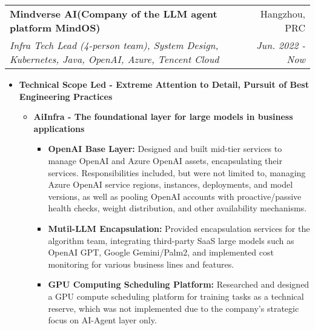 \documentclass[letterpaper,11pt]{article}
\makeatletter
\newcommand{\resumeSubheading}[4]{
	\vspace{-1pt}\item
	\begin{tabular*}{0.97\textwidth}[t]{l@{\extracolsep{\fill}}r}
		\textbf{#1} & #2 \\
		\textit{\small#3} & \textit{\small #4} \\
	\end{tabular*}\vspace{-5pt}
}
\makeatother
\begin{document}
\begin{spacing}{1.0}
	\resumeSubheading
	{Mindverse AI(Company of the LLM agent platform MindOS)}{Hangzhou, PRC}
	{Infra Tech Lead (4-person team), System Design, Kubernetes, Java, OpenAI, Azure, Tencent Cloud}{Jun. 2022 - Now}
	\begin{itemize}
		\item \textbf{Technical Scope Led - Extreme Attention to Detail, Pursuit of Best Engineering Practices}
		\begin{itemize}
			\item \textbf{AiInfra - The foundational layer for large models in business applications}
			\begin{itemize}
				\item \textbf{OpenAI Base Layer: }Designed and built mid-tier services to manage OpenAI and Azure OpenAI assets, encapsulating their services. Responsibilities included, but were not limited to, managing Azure OpenAI service regions, instances, deployments, and model versions, as well as pooling OpenAI accounts with proactive/passive health checks, weight distribution, and other availability mechanisms.
				\item \textbf{Mutil-LLM Encapsulation: }Provided encapsulation services for the algorithm team, integrating third-party SaaS large models such as OpenAI GPT, Google Gemini/Palm2, and implemented cost monitoring for various business lines and features.
				\item \textbf{GPU Computing Scheduling Platform: }Researched and designed a GPU compute scheduling platform for training tasks as a technical reserve, which was not implemented due to the company's strategic focus on AI-Agent layer only.
			\end{itemize}
			

\end{itemize}
\end{itemize}
\end{spacing}
\end{document}
